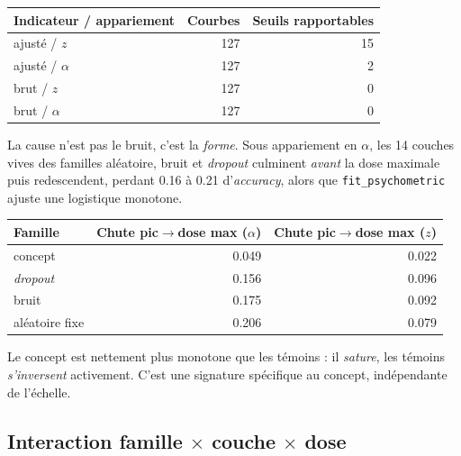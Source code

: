 \documentclass[11pt,a4paper]{article}
\newcommand{\code}[1]{\texttt{\small #1}}
\begin{document}
\begin{center}
\begin{tabular}{lrr}
\toprule
Indicateur / appariement & Courbes & Seuils rapportables \\
\midrule
ajusté / $z$      & 127 & 15 \\
ajusté / $\alpha$ & 127 & 2 \\
brut / $z$        & 127 & 0 \\
brut / $\alpha$   & 127 & 0 \\
\bottomrule
\end{tabular}
\end{center}

\noindent
La cause n'est pas le bruit, c'est la \emph{forme}. Sous appariement en $\alpha$, les
\num{14} couches vives des familles aléatoire, bruit et \emph{dropout} culminent
\emph{avant} la dose maximale puis redescendent, perdant \num{0.16} à \num{0.21}
d'\emph{accuracy}, alors que \code{fit\_psychometric} ajuste une logistique monotone.

\begin{center}
\begin{tabular}{lrr}
\toprule
Famille & Chute pic$\to$dose max ($\alpha$) & Chute pic$\to$dose max ($z$) \\
\midrule
concept          & \num{0.049} & \num{0.022} \\
\emph{dropout}   & \num{0.156} & \num{0.096} \\
bruit            & \num{0.175} & \num{0.092} \\
aléatoire fixe   & \num{0.206} & \num{0.079} \\
\bottomrule
\end{tabular}
\end{center}

\noindent
Le concept est nettement plus monotone que les témoins : il \emph{sature}, les témoins
\emph{s'inversent} activement. C'est une signature spécifique au concept, indépendante de
l'échelle.

\begin{center}\end{center}

\subsection{Interaction famille \texorpdfstring{$\times$}{x} couche \texorpdfstring{$\times$}{x} dose}
\end{document}
